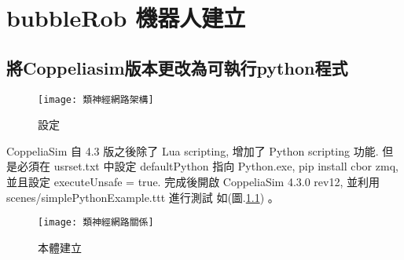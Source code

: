 \chapter{bubbleRob 機器人建立}
\section{將Coppeliasim版本更改為可執行python程式}
\begin{figure}[hbt!]
\begin{center}
\texttt{[image: 類神經網路架構]}
\caption{\Large 設定 }\label{ 設定 }
\end{center}
\end{figure} 
 CoppeliaSim 自 4.3 版之後除了 Lua scripting, 增加了 Python scripting 功能. 但是必須在 usrset.txt 中設定 defaultPython 指向 Python.exe, pip install cbor zmq, 並且設定 executeUnsafe = true. 完成後開啟 CoppeliaSim 4.3.0 rev12, 並利用 scenes/simplePythonExample.ttt 進行測試  如(圖.\ref{ 設定 }) 。\\


\newpage
\begin{figure}
\begin{center}
\texttt{[image: 類神經網路關係]}
\caption{\Large 本體建立}
\label{本體建立}
\end{center}
\end{figure}
